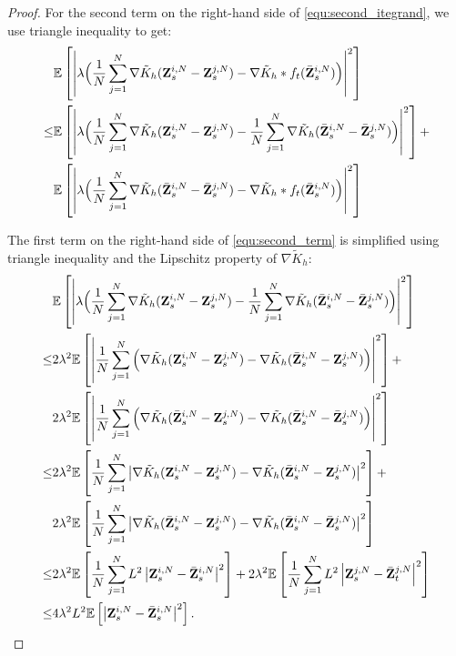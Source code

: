\begin{proof}
For the second term on the right-hand side of \eqref{equ:second_itegrand}, we use triangle inequality to get:
\begin{equation}
\label{equ:second_term}
\begin{aligned}
& \mathbb E \left[\left|\lambda \Big(\frac{1}{N}\sum_{j=1}^N \nabla \tilde  K_h(\mathbf{Z}^{i,N}_s - \mathbf{Z}^{j,N}_s) - \nabla\tilde{K}_h*f_t(\bar{\mathbf{Z}}^{i,N}_s)  \Big) \right|^2\right] \\
\leq& \mathbb E \left[\left|\lambda \Big(\frac{1}{N}\sum_{j=1}^N \nabla \tilde  K_h(\mathbf{Z}^{i,N}_s - \mathbf{Z}^{j,N}_s) - \frac{1}{N}\sum_{j=1}^N \nabla \tilde  K_h(\bar{\mathbf{Z}}^{i,N}_s - \bar{\mathbf{Z}}^{j,N}_s)  \Big) \right|^2\right] + \\&\mathbb E \left[\left|\lambda \Big(\frac{1}{N}\sum_{j=1}^N \nabla \tilde  K_h(\bar{\mathbf{Z}}^{i,N}_s - \bar{\mathbf{Z}}^{j,N}_s) - \nabla\tilde{K}_h*f_t(\bar{\mathbf{Z}}^{i,N}_s)  \Big) \right|^2\right]
\end{aligned}
\end{equation}

The first term on the right-hand side of \eqref{equ:second_term} is simplified using triangle inequality and the Lipschitz property of $\nabla \tilde{K}_h$:
\begin{equation*}
\begin{aligned}
&\mathbb E \left[\left|\lambda \Big(\frac{1}{N}\sum_{j=1}^N \nabla \tilde  K_h(\mathbf{Z}^{i,N}_s - \mathbf{Z}^{j,N}_s) - \frac{1}{N}\sum_{j=1}^N \nabla \tilde  K_h(\bar{\mathbf{Z}}^{i,N}_s - \bar{\mathbf{Z}}^{j,N}_s)  \Big) \right|^2\right] \\
\leq & 2\lambda^2 \mathbb E \left[\left|\frac{1}{N}\sum_{j=1}^N \Big(\nabla \tilde  K_h(\mathbf{Z}^{i,N}_s - \mathbf{Z}^{j,N}_s) - \nabla \tilde  K_h(\bar{\mathbf{Z}}^{i,N}_s - \mathbf{Z}^{j,N}_s)  \Big) \right|^2\right] + \\&2\lambda^2 \mathbb E \left[\left|\frac{1}{N}\sum_{j=1}^N \Big(\nabla \tilde  K_h(\bar{\mathbf{Z}}^{i,N}_s - \mathbf{Z}^{j,N}_s) - \nabla \tilde  K_h(\bar{\mathbf{Z}}^{i,N}_s - \bar{\mathbf{Z}}^{j,N}_s)  \Big) \right|^2\right]\\
\leq & 2\lambda^2 \mathbb E \left[\frac{1}{N}\sum_{j=1}^N \left|\nabla \tilde  K_h(\mathbf{Z}^{i,N}_s - \mathbf{Z}^{j,N}_s) - \nabla \tilde  K_h(\bar{\mathbf{Z}}^{i,N}_s - \mathbf{Z}^{j,N}_s) \right|^2\right] + \\&2\lambda^2 \mathbb E \left[\frac{1}{N}\sum_{j=1}^N \left|\nabla \tilde  K_h(\bar{\mathbf{Z}}^{i,N}_s - \mathbf{Z}^{j,N}_s) - \nabla \tilde  K_h(\bar{\mathbf{Z}}^{i,N}_s - \bar{\mathbf{Z}}^{j,N}_s) \right|^2 \right]\\
\leq & 2\lambda^2 \mathbb E \left[\frac{1}{N}\sum_{j=1}^N L^2\left|\mathbf{Z}^{i,N}_s - \bar{\mathbf{Z}}^{i,N}_s\right|^2 \right] + 2\lambda^2 \mathbb E \left[\frac{1}{N} \sum_{j=1}^N L^2 \left|\mathbf{Z}^{j,N}_s -\bar{\mathbf{Z}}^{j,N}_t\right|^2\right]\\
\leq & 4\lambda^2 L^2 \mathbb E \left[\left|\mathbf{Z}^{i,N}_s - \bar{\mathbf{Z}}^{i,N}_s\right|^2\right].
\end{aligned}
\end{equation*}


\end{proof}

